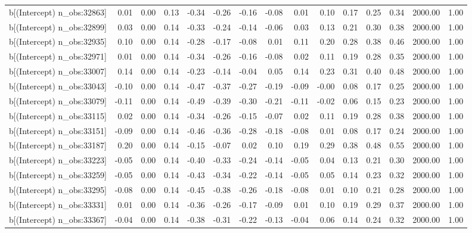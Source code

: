 \begin{table}[ht]
\begin{tabular}{rrrrrrrrrrrrrrr}
  b[(Intercept) n\_obs:32863] & 0.01 & 0.00 & 0.13 & -0.34 & -0.26 & -0.16 & -0.08 & 0.01 & 0.10 & 0.17 & 0.25 & 0.34 & 2000.00 & 1.00 \\ 
  b[(Intercept) n\_obs:32899] & 0.03 & 0.00 & 0.14 & -0.33 & -0.24 & -0.14 & -0.06 & 0.03 & 0.13 & 0.21 & 0.30 & 0.38 & 2000.00 & 1.00 \\ 
  b[(Intercept) n\_obs:32935] & 0.10 & 0.00 & 0.14 & -0.28 & -0.17 & -0.08 & 0.01 & 0.11 & 0.20 & 0.28 & 0.38 & 0.46 & 2000.00 & 1.00 \\ 
  b[(Intercept) n\_obs:32971] & 0.01 & 0.00 & 0.14 & -0.34 & -0.26 & -0.16 & -0.08 & 0.02 & 0.11 & 0.19 & 0.28 & 0.35 & 2000.00 & 1.00 \\ 
  b[(Intercept) n\_obs:33007] & 0.14 & 0.00 & 0.14 & -0.23 & -0.14 & -0.04 & 0.05 & 0.14 & 0.23 & 0.31 & 0.40 & 0.48 & 2000.00 & 1.00 \\ 
  b[(Intercept) n\_obs:33043] & -0.10 & 0.00 & 0.14 & -0.47 & -0.37 & -0.27 & -0.19 & -0.09 & -0.00 & 0.08 & 0.17 & 0.25 & 2000.00 & 1.00 \\ 
  b[(Intercept) n\_obs:33079] & -0.11 & 0.00 & 0.14 & -0.49 & -0.39 & -0.30 & -0.21 & -0.11 & -0.02 & 0.06 & 0.15 & 0.23 & 2000.00 & 1.00 \\ 
  b[(Intercept) n\_obs:33115] & 0.02 & 0.00 & 0.14 & -0.34 & -0.26 & -0.15 & -0.07 & 0.02 & 0.11 & 0.19 & 0.28 & 0.38 & 2000.00 & 1.00 \\ 
  b[(Intercept) n\_obs:33151] & -0.09 & 0.00 & 0.14 & -0.46 & -0.36 & -0.28 & -0.18 & -0.08 & 0.01 & 0.08 & 0.17 & 0.24 & 2000.00 & 1.00 \\ 
  b[(Intercept) n\_obs:33187] & 0.20 & 0.00 & 0.14 & -0.15 & -0.07 & 0.02 & 0.10 & 0.19 & 0.29 & 0.38 & 0.48 & 0.55 & 2000.00 & 1.00 \\ 
  b[(Intercept) n\_obs:33223] & -0.05 & 0.00 & 0.14 & -0.40 & -0.33 & -0.24 & -0.14 & -0.05 & 0.04 & 0.13 & 0.21 & 0.30 & 2000.00 & 1.00 \\ 
  b[(Intercept) n\_obs:33259] & -0.05 & 0.00 & 0.14 & -0.43 & -0.34 & -0.22 & -0.14 & -0.05 & 0.05 & 0.14 & 0.23 & 0.32 & 2000.00 & 1.00 \\ 
  b[(Intercept) n\_obs:33295] & -0.08 & 0.00 & 0.14 & -0.45 & -0.38 & -0.26 & -0.18 & -0.08 & 0.01 & 0.10 & 0.21 & 0.28 & 2000.00 & 1.00 \\ 
  b[(Intercept) n\_obs:33331] & 0.01 & 0.00 & 0.14 & -0.36 & -0.26 & -0.17 & -0.09 & 0.01 & 0.10 & 0.19 & 0.29 & 0.37 & 2000.00 & 1.00 \\ 
  b[(Intercept) n\_obs:33367] & -0.04 & 0.00 & 0.14 & -0.38 & -0.31 & -0.22 & -0.13 & -0.04 & 0.06 & 0.14 & 0.24 & 0.32 & 2000.00 & 1.00 \\ 

\end{tabular}
\end{table}
